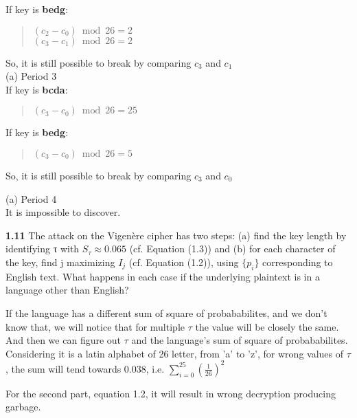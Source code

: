 If key is \textbf{bedg}:
\begin{quote}
	\((c_2 - c_0) \bmod 26 = 2\)\\
    \((c_3 - c_1) \bmod 26 = 2\)
\end{quote}

So, it is still possible to break by comparing \(c_3\) and \(c_1\)\\

(a) Period 3\\

If key is \textbf{bcda}:
\begin{quote}
	\((c_3 - c_0) \bmod 26 = 25\)
\end{quote}

If key is \textbf{bedg}:
\begin{quote}
	\((c_3 - c_0) \bmod 26 = 5\)
\end{quote}

So, it is still possible to break by comparing \(c_3\) and \(c_0\)

(a) Period 4\\

It is impossible to discover.

\vspace{1em}
\noindent
\textbf{1.11} \hspace{1em}The attack on the Vigenère cipher has two steps: (a) find the key length by identifying τ with \( S_{\tau} \approx 0.065 \) (cf. Equation (1.3)) and (b) for each character of the key, find j maximizing \(I_j\) (cf. Equation (1.2)), using \(\{p_i\}\) corresponding to English text. What happens in each case if the underlying plaintext is in a language other than English?
\vspace{1em}

If the language has a different sum of square of probababilites,  and we don't know that, we will notice that for multiple \(\tau\) the value will be closely the same. And then we can figure out \(\tau\) and the language's sum of square of probababilites. Considering it is a latin alphabet of 26 letter, from 'a' to 'z',  for wrong values of \(\tau\), the sum will tend towards 0.038, i.e. \(\sum_{i=0}^{25} \left(\frac{1}{26}\right)^2\)

For the second part, equation 1.2, it will result in wrong decryption producing garbage.




